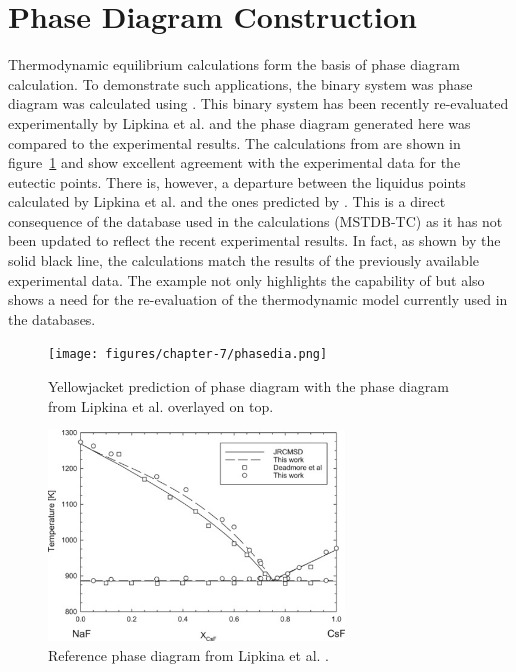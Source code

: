 \section{Phase Diagram Construction}
	Thermodynamic equilibrium calculations form the basis of phase diagram calculation. To demonstrate such applications, the  binary system was phase diagram was calculated using {\GEM}. This binary system has been recently re-evaluated experimentally by Lipkina et al. \cite{Lipkina:2022aa} and the phase diagram generated here was compared to the experimental results. The calculations from {\GEM} are shown in figure~\ref{fig:res_phased} and show excellent agreement with the experimental data for the eutectic points. There is, however, a departure between the liquidus points calculated by Lipkina et al. and the ones predicted by {\YJ}. This is a direct consequence of the database used in the calculations (MSTDB-TC) as it has not been updated to reflect the recent experimental results. In fact, as shown by the solid black line, the calculations match the results of the previously available experimental data. The example not only highlights the capability of {\GEM} but also shows a need for the re-evaluation of the  thermodynamic model currently used in the databases.
\begin{figure}
         \centering
         \texttt{[image: figures/chapter-7/phasedia.png]}
 	 \caption[Yellowjacket prediction of  phase diagram.]{Yellowjacket prediction of  phase diagram with the phase diagram from Lipkina et al. \cite{Lipkina:2022aa} overlayed on top.}
	 \label{fig:res_phased}
\end{figure}
\begin{figure}
         \centering
         \includegraphics[width=0.7\textwidth]{figures/chapter-7/pdo.png}
         \caption[Reference  phase  diagram from Lipkina et al.]{Reference  phase  diagram from Lipkina et al. \cite{Lipkina:2022aa}.}
     \label{fig:res_refdia}
\end{figure}

